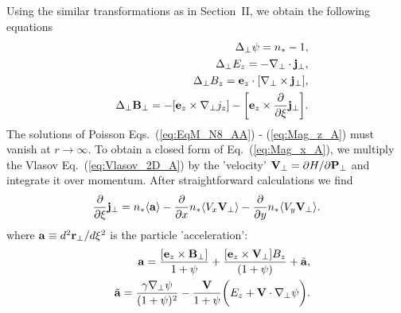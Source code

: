 \documentclass[twocolumn,showpacs,aip]{revtex4}
\begin{document}
\begin{appendix}
Using the similar transformations as in Section~II, we obtain the following equations  
\begin{eqnarray}
&&\Delta_{\perp} \psi=n_{*}-1, \label{eq:EqM_N8_AA}\\
&&\Delta_{\perp}E_z=-\nabla_{\perp}\cdot{\bf{j}}_{\perp},
\label{eq:EqM_N8_A}\\
&&\Delta_{\perp}B_z={\bf{e}}_z\cdot[\nabla_{\perp}\times {\bf{j}}_{\perp}], \label{eq:Mag_z_A}\\
&&\Delta_{\perp}{\bf{B}}_{\perp}=-[{\bf{e}}_z\times\nabla_{\perp}j_z]
-\bigg[{\bf{e}}_z\times\frac{\partial }{\partial \xi} {\bf{j}}_{\perp}\bigg]. \label{eq:Mag_x_A}
\end{eqnarray}
The solutions of Poisson Eqs.~(\ref{eq:EqM_N8_AA}) - (\ref{eq:Mag_z_A}) must vanish at $r\rightarrow\infty$.  To obtain a closed form of Eq.~(\ref{eq:Mag_x_A}), we  multiply the Vlasov Eq.~(\ref{eq:Vlasov_2D_A}) 
by the 'velocity' ${\bf{V}}_{\perp}=\partial H/\partial{\bf{P}}_{\perp}$ and integrate it over momentum. After straightforward calculations we find
\begin{eqnarray}
\frac{\partial}{\partial\xi}{\bf{j}}_{\perp}=n_{*}\langle{\bf{a}}\rangle-\frac{\partial}{\partial x}n_{*}\langle V_x{\bf{V}}_{\perp}\rangle-\frac{\partial}{\partial y}n_{*}\langle V_y{\bf{V}}_{\perp}\rangle.
\label{eq:FluxPres}
\end{eqnarray}
where ${\bf{a}}\equiv {d^2{\bf{r}}_{\perp}}/{d\xi^2}$ is the particle 'acceleration':
\begin{eqnarray}
&&{\bf{a}}=\frac{[{\bf{e}}_z\times {\bf{B}}_{\perp}]}{1+\psi}+\frac{[{\bf{e}}_z \times  {\bf{V}}_{\perp}]B_z}
{(1+\psi)}
+\tilde{\bf{a}},\\
&&\tilde{\bf{a}}=\frac{\gamma \nabla_{\perp}\psi}{(1+\psi)^2}-\frac{{\bf{V}}}{1+\psi}\bigg(E_z+{\bf{V}}\cdot
\nabla_{\perp} \psi\bigg).
\label{eq:accel_A}
\end{eqnarray}


\end{appendix}
\end{document}
